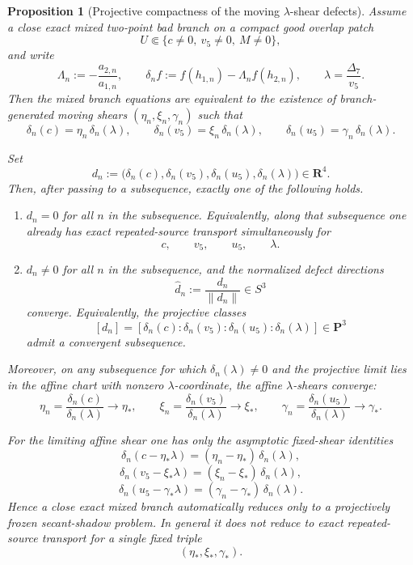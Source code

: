 \documentclass[11pt,a4paper]{amsart}
\theoremstyle{plain}
\newtheorem{proposition}[theorem]{Proposition}
\theoremstyle{definition}
\begin{document}
\begin{proposition}[Projective compactness of the moving $\lambda$-shear defects]
\label{prop:projective-compactness-moving-lambda-shear-two-point}
Assume a close exact mixed two-point bad branch on a compact good overlap patch
\[
U\Subset\{c\neq 0,\ v_5\neq 0,\ M\neq 0\},
\]
and write
\[
\Lambda_n:=-\frac{a_{2,n}}{a_{1,n}},
\qquad
\delta_n f:=f(h_{1,n})-\Lambda_n f(h_{2,n}),
\qquad
\lambda=\frac{\Delta_7}{v_5}.
\]
Then the mixed branch equations are equivalent to the existence of branch-generated
moving shears $(\eta_n,\xi_n,\gamma_n)$ such that
\[
\delta_n(c)=\eta_n\,\delta_n(\lambda),\qquad
\delta_n(v_5)=\xi_n\,\delta_n(\lambda),\qquad
\delta_n(u_5)=\gamma_n\,\delta_n(\lambda).
\]

Set
\[
d_n:=\bigl(\delta_n(c),\delta_n(v_5),\delta_n(u_5),\delta_n(\lambda)\bigr)\in\mathbf R^4.
\]
Then, after passing to a subsequence, exactly one of the following holds.

\begin{enumerate}
\item
$d_n=0$ for all $n$ in the subsequence. Equivalently, along that subsequence one already has exact repeated-source transport simultaneously for
\[
c,\qquad v_5,\qquad u_5,\qquad \lambda.
\]

\item
$d_n\neq 0$ for all $n$ in the subsequence, and the normalized defect directions
\[
\widehat d_n:=\frac{d_n}{\|d_n\|}\in S^3
\]
converge. Equivalently, the projective classes
\[
[d_n]
=
[\delta_n(c):\delta_n(v_5):\delta_n(u_5):\delta_n(\lambda)]
\in \mathbf P^3
\]
admit a convergent subsequence.
\end{enumerate}

Moreover, on any subsequence for which $\delta_n(\lambda)\neq 0$ and the projective
limit lies in the affine chart with nonzero $\lambda$-coordinate, the affine
$\lambda$-shears converge:
\[
\eta_n=\frac{\delta_n(c)}{\delta_n(\lambda)}\to\eta_*,
\qquad
\xi_n=\frac{\delta_n(v_5)}{\delta_n(\lambda)}\to\xi_*,
\qquad
\gamma_n=\frac{\delta_n(u_5)}{\delta_n(\lambda)}\to\gamma_*.
\]

For the limiting affine shear one has only the asymptotic fixed-shear identities
\[
\delta_n(c-\eta_*\lambda)=(\eta_n-\eta_*)\,\delta_n(\lambda),
\]
\[
\delta_n(v_5-\xi_*\lambda)=(\xi_n-\xi_*)\,\delta_n(\lambda),
\]
\[
\delta_n(u_5-\gamma_*\lambda)=(\gamma_n-\gamma_*)\,\delta_n(\lambda).
\]
Hence a close exact mixed branch automatically reduces only to a
\emph{projectively frozen secant-shadow problem}. In general it does \emph{not}
reduce to exact repeated-source transport for a single fixed triple
\[
(\eta_*,\xi_*,\gamma_*).
\]
\end{proposition}
\end{document}
